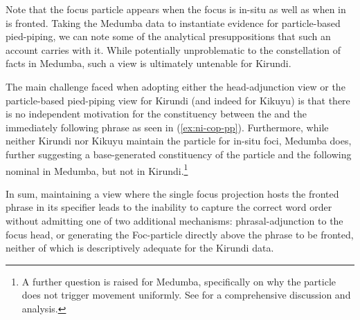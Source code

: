 \documentclass[12pt]{article}
\begin{document}
\bex
\ex {}
\bxl
{}
\fxl
\fex

Note that the focus particle  appears when the focus is in-situ as well as when in is fronted. Taking the Medumba data to instantiate evidence for particle-based pied-piping, we can note some of the analytical presuppositions that such an account carries with it. While potentially unproblematic to the constellation of facts in Medumba, such a view is ultimately untenable for Kirundi.

The main challenge faced when adopting either the head-adjunction view or the particle-based pied-piping view for Kirundi (and indeed for Kikuyu) is that there is no independent motivation for the constituency between the  and the immediately following phrase as seen in (\ref{ex:ni-cop-pp}). Furthermore, while neither Kirundi nor Kikuyu maintain the particle for in-situ foci, Medumba does, further suggesting a base-generated constituency of the particle and the following nominal in Medumba, but not in Kirundi.\footnote{A further question is raised for Medumba, specifically on why the particle does not trigger movement uniformly. See \citealt{keupdjio-2020} for a comprehensive discussion and analysis.}

\bex
{}
\fex

In sum, maintaining a view where the single focus projection hosts the fronted phrase in its specifier leads to the inability to capture the correct word order without admitting one of two additional mechanisms: phrasal-adjunction to the focus head, or generating the Foc-particle directly above the phrase to be fronted, neither of which is descriptively adequate for the Kirundi data.
\end{document}
